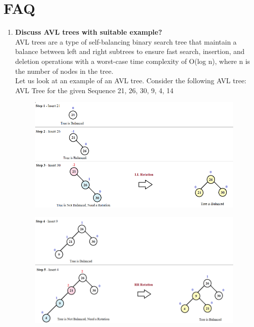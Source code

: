 \documentclass[11pt]{article}
\begin{document}
\section{FAQ}
\begin{enumerate}
    \item \textbf{Discuss AVL trees with suitable example?}\\
          AVL trees are a type of self-balancing binary search tree that maintain a balance between left and right subtrees to ensure fast search, insertion, and deletion operations with a worst-case time complexity of O(log n), where n is the number of nodes in the tree.\\


          Let us look at an example of an AVL tree. Consider the following AVL tree:\\
          AVL Tree for the given Sequence 21, 26, 30, 9, 4, 14

          \begin{figure}[H]
              \centering
              \includegraphics[width=.85\textwidth]{AVL1.png}
          \end{figure}

          \begin{figure}[H]
              \centering
              \includegraphics[width=.85\textwidth]{AVL 2.png}
          \end{figure}


\end{enumerate}
\end{document}
